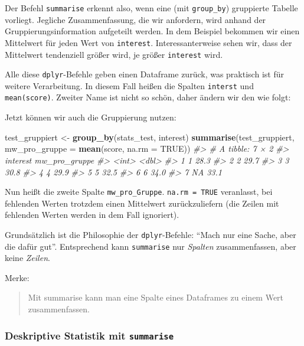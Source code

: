 \documentclass[12pt,ngerman,]{book}
\newenvironment{Shaded}{\begin{snugshade}}{\end{snugshade}}
\newcommand{\KeywordTok}[1]{\textcolor[rgb]{0.13,0.29,0.53}{\textbf{{#1}}}}
\newcommand{\DataTypeTok}[1]{\textcolor[rgb]{0.13,0.29,0.53}{{#1}}}
\newcommand{\StringTok}[1]{\textcolor[rgb]{0.31,0.60,0.02}{{#1}}}
\newcommand{\CommentTok}[1]{\textcolor[rgb]{0.56,0.35,0.01}{\textit{{#1}}}}
\newcommand{\OtherTok}[1]{\textcolor[rgb]{0.56,0.35,0.01}{{#1}}}
\newcommand{\NormalTok}[1]{{#1}}
\renewenvironment{Shaded}{\begin{kframe}}{\end{kframe}}
\begin{document}
Der Befehl \texttt{summarise} erkennt also, wenn eine (mit
\texttt{group\_by}) gruppierte Tabelle vorliegt. Jegliche
Zusammenfassung, die wir anfordern, wird anhand der
Gruppierungsinformation aufgeteilt werden. In dem Beispiel bekommen wir
einen Mittelwert für jeden Wert von \texttt{interest}.
Interessanterweise sehen wir, dass der Mittelwert tendenziell größer
wird, je größer \texttt{interest} wird.

Alle diese \texttt{dplyr}-Befehle geben einen Dataframe zurück, was
praktisch ist für weitere Verarbeitung. In diesem Fall heißen die
Spalten \texttt{interst} und \texttt{mean(score)}. Zweiter Name ist
nicht so schön, daher ändern wir den wie folgt:

Jetzt können wir auch die Gruppierung nutzen:

\begin{Shaded}
\begin{Highlighting}[]
\NormalTok{test_gruppiert <-}\StringTok{ }\KeywordTok{group_by}\NormalTok{(stats_test, interest)}
\KeywordTok{summarise}\NormalTok{(test_gruppiert, }\DataTypeTok{mw_pro_gruppe =} \KeywordTok{mean}\NormalTok{(score, }\DataTypeTok{na.rm =} \OtherTok{TRUE}\NormalTok{))}
\CommentTok{#> # A tibble: 7 × 2}
\CommentTok{#>   interest mw_pro_gruppe}
\CommentTok{#>      <int>         <dbl>}
\CommentTok{#> 1        1          28.3}
\CommentTok{#> 2        2          29.7}
\CommentTok{#> 3        3          30.8}
\CommentTok{#> 4        4          29.9}
\CommentTok{#> 5        5          32.5}
\CommentTok{#> 6        6          34.0}
\CommentTok{#> 7       NA          33.1}
\end{Highlighting}
\end{Shaded}

Nun heißt die zweite Spalte \texttt{mw\_pro\_Gruppe}.
\texttt{na.rm\ =\ TRUE} veranlasst, bei fehlenden Werten trotzdem einen
Mittelwert zurückzuliefern (die Zeilen mit fehlenden Werten werden in
dem Fall ignoriert).

Grundsätzlich ist die Philosophie der \texttt{dplyr}-Befehle: ``Mach nur
eine Sache, aber die dafür gut''. Entsprechend kann \texttt{summarise}
nur \emph{Spalten} zusammenfassen, aber keine \emph{Zeilen}.

Merke:

\begin{quote}
Mit summarise kann man eine Spalte eines Dataframes zu einem Wert
zusammenfassen.
\end{quote}

\subsubsection{\texorpdfstring{Deskriptive Statistik mit
\texttt{summarise}}{Deskriptive Statistik mit summarise}}\label{deskriptive-statistik-mit-summarise}
\end{document}
